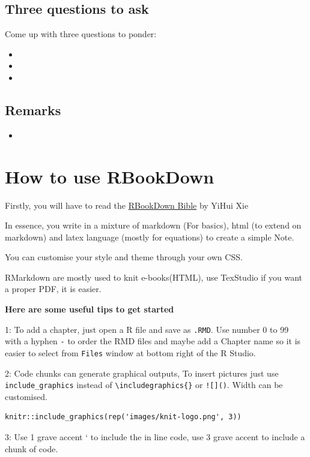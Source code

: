 \documentclass[
]{book}
\providecommand{\tightlist}{%
  \setlength{\itemsep}{0pt}\setlength{\parskip}{0pt}}
\begin{document}
\hypertarget{three-questions-to-ask}{%
\section*{Three questions to ask}\label{three-questions-to-ask}}

Come up with three questions to ponder:

\begin{itemize}
\tightlist
\item
\item
\item
\end{itemize}

\hypertarget{remarks}{%
\section*{Remarks}\label{remarks}}

\begin{itemize}
\tightlist
\item
\end{itemize}

\hypertarget{how-to-use-rbookdown}{%
\chapter*{How to use RBookDown}\label{how-to-use-rbookdown}}

Firstly, you will have to read the \href{https://bookdown.org/yihui/bookdown/}{RBookDown Bible} by YiHui Xie

In essence, you write in a mixture of markdown (For basics), html (to extend on markdown) and latex language (mostly for equations) to create a simple Note.

You can customise your style and theme through your own CSS.

RMarkdown are mostly used to knit e-books(HTML), use TexStudio if you want a proper PDF, it is easier.

\textbf{Here are some useful tips to get started}

1: To add a chapter, just open a R file and save as \texttt{.RMD}. Use number 0 to 99 with a hyphen \texttt{-} to order the RMD files and maybe add a Chapter name so it is easier to select from \texttt{Files} window at bottom right of the R Studio.

2: Code chunks can generate graphical outputs, To insert pictures just use \texttt{include\_graphics} instead of \texttt{\textbackslash{}includegraphics\{\}} or \texttt{!{[}{]}()}. Width can be customised.

\begin{verbatim}
knitr::include_graphics(rep('images/knit-logo.png', 3))
\end{verbatim}

3: Use 1 grave accent ` to include the in line code, use 3 grave accent to include a chunk of code.

  
\end{document}
